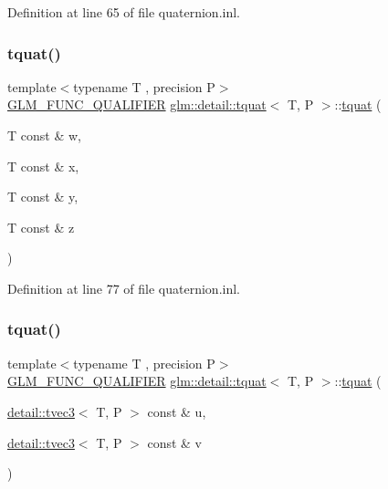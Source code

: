 Definition at line 65 of file quaternion.\+inl.

\mbox{\label{structglm_1_1detail_1_1tquat_af383bd6a9c92f94bc8b7ba0be770d4e5}} 
\subsubsection{\texorpdfstring{tquat()}{tquat()}\hspace{0.1cm}{\footnotesize\ttfamily [4/9]}}
{\footnotesize\ttfamily template$<$typename T , precision P$>$ \\
\hyperlink{setup_8hpp_a33fdea6f91c5f834105f7415e2a64407}{G\+L\+M\+\_\+\+F\+U\+N\+C\+\_\+\+Q\+U\+A\+L\+I\+F\+I\+ER} \hyperlink{structglm_1_1detail_1_1tquat}{glm\+::detail\+::tquat}$<$ T, P $>$\+::\hyperlink{structglm_1_1detail_1_1tquat}{tquat} (\begin{DoxyParamCaption}\item[{T const \&}]{w,  }\item[{T const \&}]{x,  }\item[{T const \&}]{y,  }\item[{T const \&}]{z }\end{DoxyParamCaption})}



Definition at line 77 of file quaternion.\+inl.

\mbox{\label{structglm_1_1detail_1_1tquat_a203189580d111eb8a73ed10a1d640464}} 
\subsubsection{\texorpdfstring{tquat()}{tquat()}\hspace{0.1cm}{\footnotesize\ttfamily [5/9]}}
{\footnotesize\ttfamily template$<$typename T , precision P$>$ \\
\hyperlink{setup_8hpp_a33fdea6f91c5f834105f7415e2a64407}{G\+L\+M\+\_\+\+F\+U\+N\+C\+\_\+\+Q\+U\+A\+L\+I\+F\+I\+ER} \hyperlink{structglm_1_1detail_1_1tquat}{glm\+::detail\+::tquat}$<$ T, P $>$\+::\hyperlink{structglm_1_1detail_1_1tquat}{tquat} (\begin{DoxyParamCaption}\item[{\hyperlink{structglm_1_1detail_1_1tvec3}{detail\+::tvec3}$<$ T, P $>$ const \&}]{u,  }\item[{\hyperlink{structglm_1_1detail_1_1tvec3}{detail\+::tvec3}$<$ T, P $>$ const \&}]{v }\end{DoxyParamCaption})\hspace{0.3cm}{\ttfamily [explicit]}}

